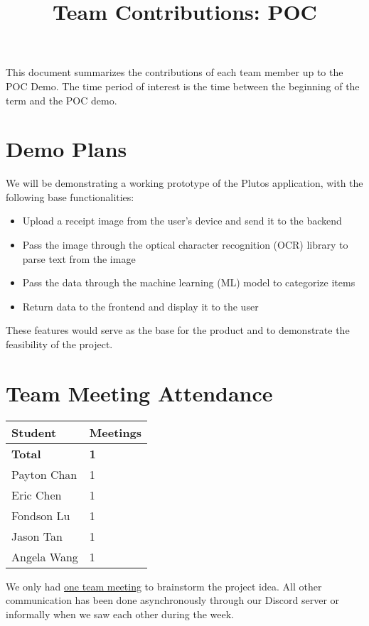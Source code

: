 \documentclass{article}
\title{Team Contributions: POC\\\progname}
\author{\authname}
\date{}
\begin{document}
\maketitle

This document summarizes the contributions of each team member up to the POC
Demo.  The time period of interest is the time between the beginning of the term
and the POC demo.

\section{Demo Plans}

We will be demonstrating a working prototype of the Plutos application, with the
following base functionalities:
\begin{itemize}
    \item Upload a receipt image from the user's device and send it to the
    backend
    \item Pass the image through the optical character recognition (OCR) library
    to parse text from the image
    \item Pass the data through the machine learning (ML) model to categorize
    items
    \item Return data to the frontend and display it to the user
\end{itemize}

These features would serve as the base for the product and to demonstrate the
feasibility of the project.

\section{Team Meeting Attendance}

\begin{table}[H]
\centering
\begin{tabular}{ll}
\toprule
\textbf{Student} & \textbf{Meetings}\\
\midrule
\textbf{Total} & \textbf{1}\\
Payton Chan & 1\\
Eric Chen & 1\\
Fondson Lu & 1\\
Jason Tan & 1\\
Angela Wang & 1\\
\bottomrule
\end{tabular}
\end{table}

We only had \href{https://github.com/PlutosCapstone/Plutos/issues/9}{one team
meeting} to brainstorm the project idea. All other communication has been done
asynchronously through our Discord server or informally when we saw each other
during the week.
\end{document}
